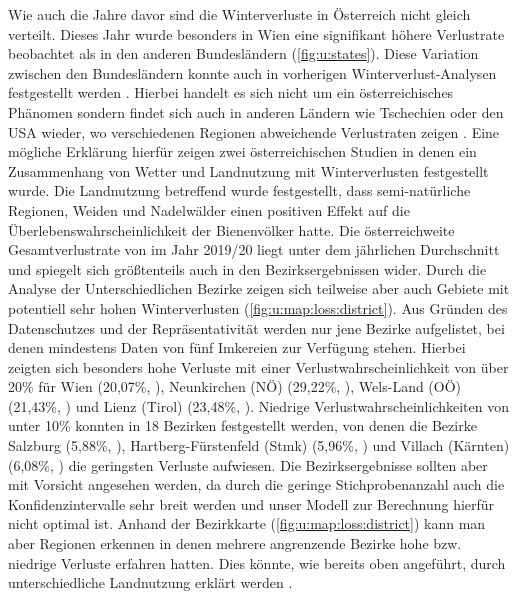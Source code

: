 Wie auch die Jahre davor sind die Winterverluste in Österreich nicht gleich verteilt. Dieses Jahr wurde besonders in Wien eine signifikant höhere Verlustrate beobachtet als in den anderen Bundesländern (\cref{fig:u:states}). Diese Variation zwischen den Bundesländern konnte auch in vorherigen Winterverlust-Analysen festgestellt werden \citep{crailsheim2018, brodschneider2018a, brodschneider2019b, oberreiter2020}. Hierbei handelt es sich nicht um ein österreichisches Phänomen sondern findet sich auch in anderen Ländern wie Tschechien oder den USA wieder, wo verschiedenen Regionen abweichende Verlustraten zeigen \citep{brodschneider2019,vanengelsdorp2008,vanengelsdorp2010}. Eine mögliche Erklärung hierfür zeigen zwei österreichischen Studien in denen ein Zusammenhang von Wetter \citep{switanek2017} und Landnutzung \citep{kuchling2018} mit Winterverlusten festgestellt wurde. Die Landnutzung betreffend wurde festgestellt, dass semi-natürliche Regionen, Weiden und Nadelwälder einen positiven Effekt auf die Überlebenswahrscheinlichkeit der Bienenvölker hatte.
\newline
Die österreichweite Gesamtverlustrate von  im Jahr 2019/20 liegt unter dem jährlichen Durchschnitt und spiegelt sich größtenteils auch in den Bezirksergebnissen wider. 
\newline
Durch die Analyse der Unterschiedlichen Bezirke zeigen sich teilweise aber auch Gebiete mit potentiell sehr hohen Winterverlusten (\cref{fig:u:map:loss:district}). Aus Gründen des Datenschutzes und der Repräsentativität werden nur jene Bezirke aufgelistet, bei denen mindestens Daten von fünf Imkereien zur Verfügung stehen. Hierbei zeigten sich besonders hohe Verluste mit einer Verlustwahrscheinlichkeit von über 20\% für Wien (20,07\%, ), Neunkirchen (NÖ) (29,22\%, ), Wels-Land (OÖ) (21,43\%, ) und Lienz (Tirol) (23,48\%, ). Niedrige Verlustwahrscheinlichkeiten von unter 10\% konnten in 18 Bezirken festgestellt werden, von denen die Bezirke Salzburg (5,88\%, ), Hartberg-Fürstenfeld (Stmk) (5,96\%, ) und Villach (Kärnten) (6,08\%, ) die geringsten Verluste aufwiesen.
\newline
Die Bezirksergebnisse sollten aber mit Vorsicht angesehen werden, da durch die geringe Stichprobenanzahl auch die Konfidenzintervalle sehr breit werden und unser Modell zur Berechnung hierfür nicht optimal ist. Anhand der Bezirkkarte (\cref{fig:u:map:loss:district}) kann man aber Regionen erkennen in denen mehrere angrenzende Bezirke hohe bzw. niedrige Verluste erfahren hatten. Dies könnte, wie bereits oben angeführt, durch unterschiedliche Landnutzung erklärt werden \citep{kuchling2018}.

